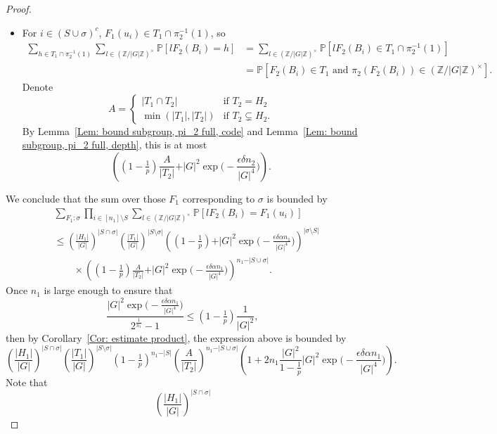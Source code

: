 \documentclass[12pt]{amsart}
\theoremstyle{definition}
\newcommand{\PPP}{\mathbb{P}}
\newcommand{\ZG}{\Z/\abs{G}\Z}
\newcommand{\abs}[1]{\vert#1\vert}
\newcommand{\Z}{\mathbb{Z}}
\begin{document}
\begin{proof}
\begin{itemize}
    \item For $i\in (S\cup \sigma)^c$, $F_1(u_i)\in T_1\cap \pi_2^{-1}(1)$, so
    \begin{align*}
    \sum_{h\in T_1\cap \pi_2^{-1}(1)}
    \sum_{l\in (\Z/\abs{G}\Z)^{\times}} \PPP[l F_2(B_i)= h]
    &=\sum_{l\in (\Z/\abs{G}\Z)^{\times}} \PPP[l F_2(B_i)\in T_1\cap \pi_2^{-1}(1)]\\
    &=\PPP[ F_2(B_i)\in T_1 \text{ and }\pi_2(F_2(B_i))\in (\ZG)^{\times}].
    \end{align*}
    Denote
    \[
    A=\begin{cases}
        \abs{T_1\cap T_2} &\text{if } T_2=H_2\\
        \min(\abs{T_1},\abs{T_2}) &\text{if } T_2\subsetneq H_2.
    \end{cases}
    \]
    By Lemma~\ref{Lem: bound subgroup, pi_2 full, code} and Lemma~\ref{Lem: bound subgroup, pi_2 full, depth}, this is at most
    \[
     \left( (1-\tfrac{1}{p}) \frac{A}{\abs{T_2}}
    +\abs{G}^2\exp\Big(-\frac{\epsilon\delta n_2}{|G|^4}\Big) \right).
    \]
\end{itemize}
We conclude that the sum over those $F_1$ corresponding to $\sigma$ is bounded by
\begin{align*}
&\sum_{F_1:\sigma}
\prod_{i\in [n_1]\setminus S} \sum_{l\in (\Z/\abs{G}\Z)^{\times}} \PPP[l F_2(B_i)= F_1(u_i)]\\
&\leq \left(\frac{\abs{H_1}}{\abs{G}}\right)^{\abs{S\cap \sigma}}
\left(\frac{\abs{T_1}}{\abs{G}}\right)^{\abs{S\setminus \sigma}}
\left( (1-\tfrac{1}{p})
     +\abs{G}^2\exp\Big(-\frac{\epsilon\delta\alpha n_1}{|G|^4}\Big) \right)^{\abs{\sigma\setminus S}}\\ 
&\quad\quad\times
\left( (1-\tfrac{1}{p}) \frac{A}{\abs{T_2}}
    +\abs{G}^2\exp\Big(-\frac{\epsilon\delta \alpha n_1}{|G|^4}\Big) \right)^{n_1-\abs{S\cup \sigma}}.
\end{align*}
Once $n_1$ is large enough to ensure that
\[
\frac{\abs{G}^2\exp\Big(-\frac{\epsilon\delta \alpha n_1}{|G|^4}\Big)}{2^{\frac{1}{n_1}}-1}
\leq (1-\tfrac{1}{p}) \frac{1}{\abs{G}^2},
\]
then by Corollary~\ref{Cor: estimate product}, the expression above is bounded by
\[
\left(\frac{\abs{H_1}}{\abs{G}}\right)^{\abs{S\cap \sigma}}
\left(\frac{\abs{T_1}}{\abs{G}}\right)^{\abs{S\setminus \sigma}}
(1-\tfrac{1}{p})^{n_1-\abs{S}} 
\left(\frac{A}{\abs{T_2}}\right)^{n_1-\abs{S\cup \sigma}}
\left(1+ 2n_1\frac{\abs{G}^2}{1-\frac{1}{p}} \abs{G}^2\exp\Big(-\frac{\epsilon\delta \alpha n_1}{|G|^4}\Big)\right).
\]
Note that
\[
\left(\frac{\abs{H_1}}{\abs{G}}\right)^{\abs{S\cap \sigma}}
\]
\end{proof}
\end{document}
